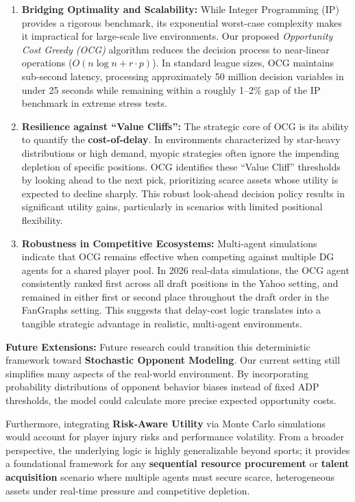 \documentclass[11pt,a4paper]{article}
\begin{document}
\begin{enumerate}[leftmargin=1.5em, itemsep=2pt, topsep=4pt]
    \item \textbf{Bridging Optimality and Scalability:} While Integer Programming (IP) provides a rigorous benchmark, its exponential worst-case complexity makes it impractical for large-scale live environments. Our proposed \emph{Opportunity Cost Greedy (OCG)} algorithm reduces the decision process to near-linear operations ($O(n \log n + r \cdot p)$). In standard league sizes, OCG maintains sub-second latency, processing approximately 50 million decision variables in under 25 seconds while remaining within a roughly 1--2\% gap of the IP benchmark in extreme stress tests.
    \item \textbf{Resilience against ``Value Cliffs'':} The strategic core of OCG is its ability to quantify the \textbf{cost-of-delay}. In environments characterized by star-heavy distributions or high demand, myopic strategies often ignore the impending depletion of specific positions. OCG identifies these ``Value Cliff'' thresholds by looking ahead to the next pick, prioritizing scarce assets whose utility is expected to decline sharply. This robust look-ahead decision policy results in significant utility gains, particularly in scenarios with limited positional flexibility.
    \item \textbf{Robustness in Competitive Ecosystems:} Multi-agent simulations indicate that OCG remains effective when competing against multiple DG agents for a shared player pool. In 2026 real-data simulations, the OCG agent consistently ranked first across all draft positions in the Yahoo setting, and remained in either first or second place throughout the draft order in the FanGraphs setting. This suggests that delay-cost logic translates into a tangible strategic advantage in realistic, multi-agent environments.
\end{enumerate}

\textbf{Future Extensions:} 
Future research could transition this deterministic framework toward \textbf{Stochastic Opponent Modeling}. Our current setting still simplifies many aspects of the real-world environment. By incorporating probability distributions of opponent behavior biases instead of fixed ADP thresholds, the model could calculate more precise expected opportunity costs. 

Furthermore, integrating \textbf{Risk-Aware Utility} via Monte Carlo simulations would account for player injury risks and performance volatility. From a broader perspective, the underlying logic is highly generalizable beyond sports; it provides a foundational framework for any \textbf{sequential resource procurement} or \textbf{talent acquisition} scenario where multiple agents must secure scarce, heterogeneous assets under real-time pressure and competitive depletion.
\end{document}

